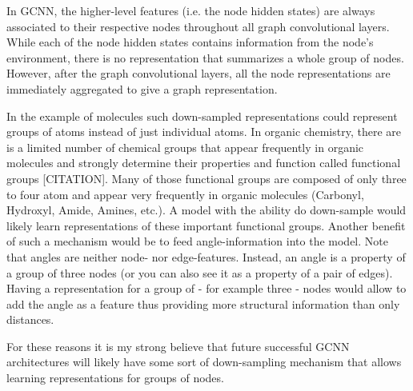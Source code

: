 In GCNN, the higher-level features (i.e. the node hidden states) are always associated to their respective nodes throughout all graph convolutional layers. While each of the node hidden states contains information from the node's environment, there is no representation that summarizes a whole group of nodes. However, after the graph convolutional layers, all the node representations are immediately aggregated to give a graph representation.

In the example of molecules such down-sampled representations could represent groups of atoms instead of just individual atoms. In organic chemistry, there are is a limited number of chemical groups that appear frequently in organic molecules and strongly determine their properties and function called functional groups [CITATION]. Many of those functional groups are composed of only three to four atom and appear very frequently in organic molecules (Carbonyl, Hydroxyl, Amide, Amines, etc.). A model with the ability do down-sample would likely learn representations of these important functional groups. Another benefit of such a mechanism would be to feed angle-information into the model. Note that angles are neither node- nor edge-features. Instead, an angle is a property of a group of three nodes (or you can also see it as a property of a pair of edges). Having a representation for a group of - for example three - nodes would allow to add the angle as a feature thus providing more structural information than only distances.

For these reasons it is my strong believe that future successful GCNN architectures will likely have some sort of down-sampling mechanism that allows learning representations for groups of nodes.


